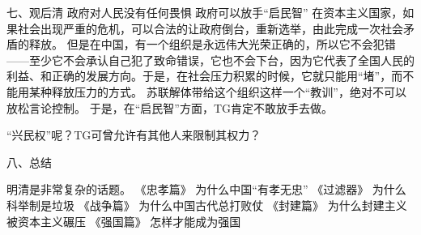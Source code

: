 七、观后清
政府对人民没有任何畏惧
政府可以放手“启民智”
在资本主义国家，如果社会出现严重的危机，可以合法的让政府倒台，重新选举，由此完成一次社会矛盾的释放。
但是在中国，有一个组织是永远伟大光荣正确的，所以它不会犯错——至少它不会承认自己犯了致命错误，它也不会下台，因为它代表了全国人民的利益、和正确的发展方向。于是，在社会压力积累的时候，它就只能用“堵”，而不能用某种释放压力的方式。
苏联解体带给这个组织这样一个“教训”，绝对不可以放松言论控制。
于是，在“启民智”方面，TG肯定不敢放手去做。

“兴民权”呢？TG可曾允许有其他人来限制其权力？

八、总结

明清是非常复杂的话题。
《忠孝篇》 为什么中国“有孝无忠”
《过滤器》 为什么科举制是垃圾
《战争篇》 为什么中国古代总打败仗
《封建篇》 为什么封建主义被资本主义碾压
《强国篇》 怎样才能成为强国
